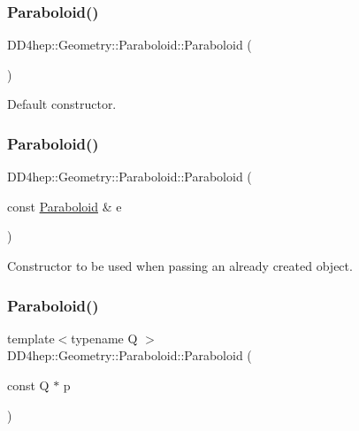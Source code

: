 \subsubsection{\texorpdfstring{Paraboloid()}{Paraboloid()}\hspace{0.1cm}{\footnotesize\ttfamily [1/5]}}
{\footnotesize\ttfamily D\+D4hep\+::\+Geometry\+::\+Paraboloid\+::\+Paraboloid (\begin{DoxyParamCaption}{ }\end{DoxyParamCaption})\hspace{0.3cm}{\ttfamily [default]}}



Default constructor. 

\hypertarget{class_d_d4hep_1_1_geometry_1_1_paraboloid_ae56bf16dff6d8b454b40f498b78572ec}{}\label{class_d_d4hep_1_1_geometry_1_1_paraboloid_ae56bf16dff6d8b454b40f498b78572ec} 
\subsubsection{\texorpdfstring{Paraboloid()}{Paraboloid()}\hspace{0.1cm}{\footnotesize\ttfamily [2/5]}}
{\footnotesize\ttfamily D\+D4hep\+::\+Geometry\+::\+Paraboloid\+::\+Paraboloid (\begin{DoxyParamCaption}\item[{const \hyperlink{class_d_d4hep_1_1_geometry_1_1_paraboloid}{Paraboloid} \&}]{e }\end{DoxyParamCaption})\hspace{0.3cm}{\ttfamily [default]}}



Constructor to be used when passing an already created object. 

\hypertarget{class_d_d4hep_1_1_geometry_1_1_paraboloid_a689f3a7fd9a1e3b0dd59c654e0997471}{}\label{class_d_d4hep_1_1_geometry_1_1_paraboloid_a689f3a7fd9a1e3b0dd59c654e0997471} 
\subsubsection{\texorpdfstring{Paraboloid()}{Paraboloid()}\hspace{0.1cm}{\footnotesize\ttfamily [3/5]}}
{\footnotesize\ttfamily template$<$typename Q $>$ \\
D\+D4hep\+::\+Geometry\+::\+Paraboloid\+::\+Paraboloid (\begin{DoxyParamCaption}\item[{const Q $\ast$}]{p }\end{DoxyParamCaption})\hspace{0.3cm}{\ttfamily [inline]}}



